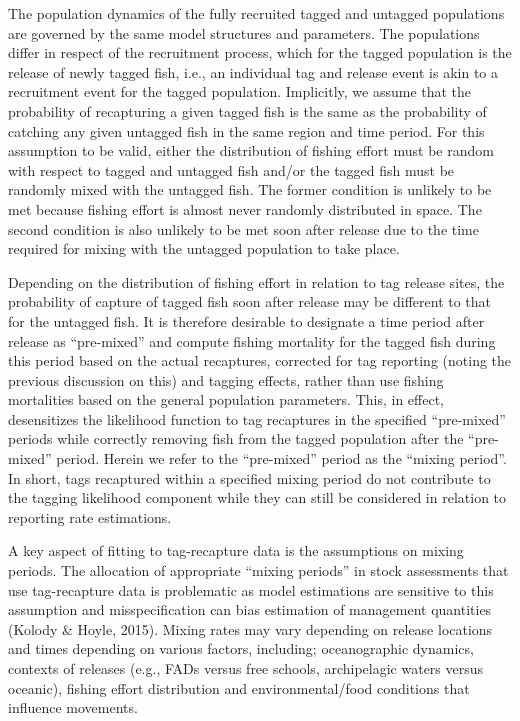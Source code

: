 \documentclass[
  english,
  a4paper,
  a4paper,
  11pt]{SCreport}
\begin{document}
The population dynamics of the fully recruited tagged and untagged
populations are governed by the same model structures and parameters.
The populations differ in respect of the recruitment process, which for
the tagged population is the release of newly tagged fish, i.e., an
individual tag and release event is akin to a recruitment event for the
tagged population. Implicitly, we assume that the probability of
recapturing a given tagged fish is the same as the probability of
catching any given untagged fish in the same region and time period. For
this assumption to be valid, either the distribution of fishing effort
must be random with respect to tagged and untagged fish and/or the
tagged fish must be randomly mixed with the untagged fish. The former
condition is unlikely to be met because fishing effort is almost never
randomly distributed in space. The second condition is also unlikely to
be met soon after release due to the time required for mixing with the
untagged population to take place.

Depending on the distribution of fishing effort in relation to tag
release sites, the probability of capture of tagged fish soon after
release may be different to that for the untagged fish. It is therefore
desirable to designate a time period after release as ``pre-mixed'' and
compute fishing mortality for the tagged fish during this period based
on the actual recaptures, corrected for tag reporting (noting the
previous discussion on this) and tagging effects, rather than use
fishing mortalities based on the general population parameters. This, in
effect, desensitizes the likelihood function to tag recaptures in the
specified ``pre-mixed'' periods while correctly removing fish from the
tagged population after the ``pre-mixed'' period. Herein we refer to the
``pre-mixed'' period as the ``mixing period''. In short, tags recaptured
within a specified mixing period do not contribute to the tagging
likelihood component while they can still be considered in relation to
reporting rate estimations.

A key aspect of fitting to tag-recapture data is the assumptions on
mixing periods. The allocation of appropriate ``mixing periods'' in
stock assessments that use tag-recapture data is problematic as model
estimations are sensitive to this assumption and misspecification can
bias estimation of management quantities (Kolody \& Hoyle, 2015). Mixing
rates may vary depending on release locations and times depending on
various factors, including; oceanographic dynamics, contexts of releases
(e.g., FADs versus free schools, archipelagic waters versus oceanic),
fishing effort distribution and environmental/food conditions that
influence movements.
\end{document}
